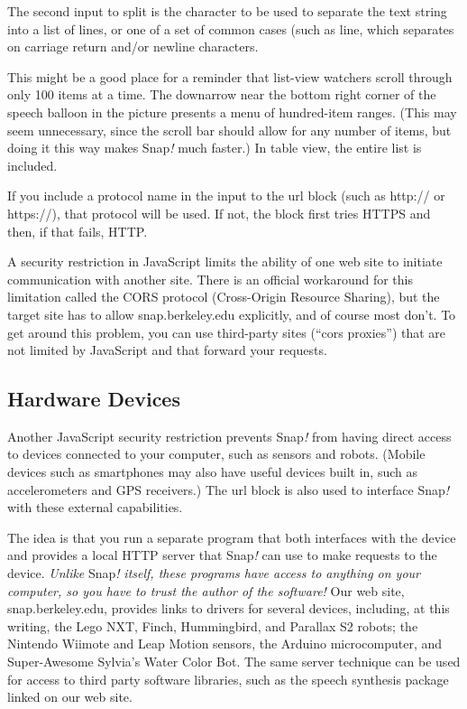 The second input to split is the character to be used to separate the
text string into a list of lines, or one of a set of common cases (such
as line, which separates on carriage return and/or newline characters.

This might be a good place for a reminder that list-view watchers scroll
through only 100 items at a time. The downarrow near the bottom right
corner of the speech balloon in the picture presents a menu of
hundred-item ranges. (This may seem unnecessary, since the scroll bar
should allow for any number of items, but doing it this way makes
Snap\emph{!} much faster.) In table view, the entire list is included.

If you include a protocol name in the input to the url block (such as
http:// or https://), that protocol will be used. If not, the block
first tries HTTPS and then, if that fails, HTTP.

A security restriction in JavaScript limits the ability of one web site
to initiate communication with another site. There is an official
workaround for this limitation called the CORS protocol (Cross-Origin
Resource Sharing), but the target site has to allow snap.berkeley.edu
explicitly, and of course most don't. To get around this problem, you
can use third-party sites (``cors proxies'') that are not limited by
JavaScript and that forward your requests.

\subsection{Hardware Devices}\label{hardware-devices}

Another JavaScript security restriction prevents Snap\emph{!} from
having direct access to devices connected to your computer, such as
sensors and robots. (Mobile devices such as smartphones may also have
useful devices built in, such as accelerometers and GPS receivers.) The
url block is also used to interface Snap\emph{!} with these external
capabilities.

The idea is that you run a separate program that both interfaces with
the device and provides a local HTTP server that Snap\emph{!} can use to
make requests to the device. \emph{Unlike} Snap\emph{!} \emph{itself,
these programs have access to anything on your computer, so you have to
trust the author of the software!} Our web site, snap.berkeley.edu,
provides links to drivers for several devices, including, at this
writing, the Lego NXT, Finch, Hummingbird, and Parallax S2 robots; the
Nintendo Wiimote and Leap Motion sensors, the Arduino microcomputer, and
Super-Awesome Sylvia's Water Color Bot. The same server technique can be
used for access to third party software libraries, such as the speech
synthesis package linked on our web site.


